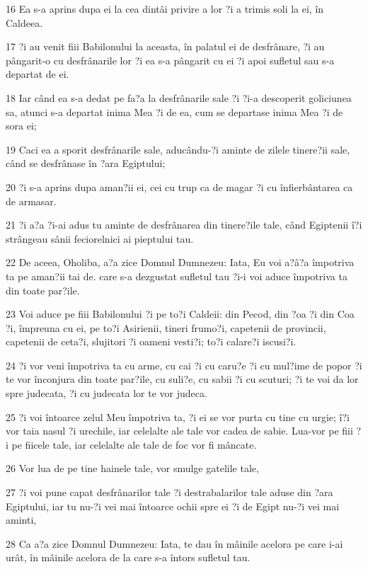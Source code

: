 \par 16 Ea s-a aprins dupa ei la cea dintâi privire a lor ?i a trimis soli la ei, în Caldeea.
\par 17 ?i au venit fiii Babilonului la aceasta, în palatul ei de desfrânare, ?i au pângarit-o cu desfrânarile lor ?i ea s-a pângarit cu ei ?i apoi sufletul sau s-a departat de ei.
\par 18 Iar când ea s-a dedat pe fa?a la desfrânarile sale ?i ?i-a descoperit goliciunea sa, atunci s-a departat inima Mea ?i de ea, cum se departase inima Mea ?i de sora ei;
\par 19 Caci ea a sporit desfrânarile sale, aducându-?i aminte de zilele tinere?ii sale, când se desfrânase în ?ara Egiptului;
\par 20 ?i s-a aprins dupa aman?ii ei, cei cu trup ca de magar ?i cu înfierbântarea ca de armasar.
\par 21 ?i a?a ?i-ai adus tu aminte de desfrânarea din tinere?ile tale, când Egiptenii î?i strângeau sânii feciorelnici ai pieptului tau.
\par 22 De aceea, Oholiba, a?a zice Domnul Dumnezeu: Iata, Eu voi a?â?a împotriva ta pe aman?ii tai de. care s-a dezgustat sufletul tau ?i-i voi aduce împotriva ta din toate par?ile.
\par 23 Voi aduce pe fiii Babilonului ?i pe to?i Caldeii: din Pecod, din ?oa ?i din Coa ?i, împreuna cu ei, pe to?i Asirienii, tineri frumo?i, capetenii de provincii, capetenii de ceta?i, slujitori ?i oameni vesti?i; to?i calare?i iscusi?i.
\par 24 ?i vor veni împotriva ta cu arme, cu cai ?i cu caru?e ?i cu mul?ime de popor ?i te vor înconjura din toate par?ile, cu suli?e, cu sabii ?i cu scuturi; ?i te voi da lor spre judecata, ?i cu judecata lor te vor judeca.
\par 25 ?i voi întoarce zelul Meu împotriva ta, ?i ei se vor purta cu tine cu urgie; î?i vor taia nasul ?i urechile, iar celelalte ale tale vor cadea de sabie. Lua-vor pe fiii ?i pe fiicele tale, iar celelalte ale tale de foc vor fi mâncate.
\par 26 Vor lua de pe tine hainele tale, vor smulge gatelile tale,
\par 27 ?i voi pune capat desfrânarilor tale ?i destrabalarilor tale aduse din ?ara Egiptului, iar tu nu-?i vei mai întoarce ochii spre ei ?i de Egipt nu-?i vei mai aminti,
\par 28 Ca a?a zice Domnul Dumnezeu: Iata, te dau în mâinile acelora pe care i-ai urât, în mâinile acelora de la care s-a întors sufletul tau.
